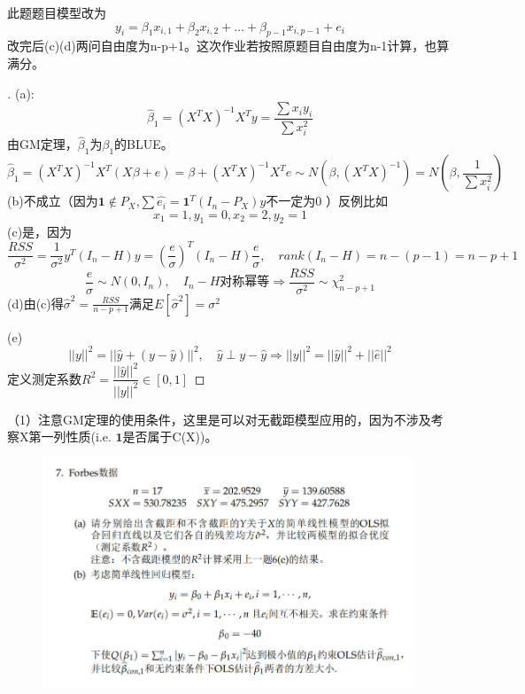 \documentclass[cn,hazy,green,12pt,normal]{elegantnote}
\numberwithin{equation}{section}
\numberwithin{subsection}{section}
\begin{document}
    此题题目模型改为\[y_i=\beta_1 x_{i,1}+\beta_2 x_{i,2}+\dots +\beta_{p-1}x_{i,p-1}+e_i\]
    改完后(c)(d)两问自由度为n-p+1。这次作业若按照原题目自由度为n-1计算，也算满分。
    
\begin{proof}[\solutionname]
(a):\[\hat{\beta}_1=(X^TX)^{-1}X^Ty = \dfrac{\sum x_iy_i}{\sum x_i^2}\]
由GM定理，$\hat{\beta}_1$为$\beta_1$的BLUE。
\[\hat{\beta}_1=(X^TX)^{-1}X^T(X\beta+e)=\beta+(X^TX)^{-1}X^T e\sim N(\beta,(X^TX)^{-1})= N(\beta,\dfrac{1}{\sum x_i^2})\]
\noindent (b)不成立（因为$\bm 1 \notin P_X$,$\sum \hat{e_i}=\bm 1^T(I_n-P_X)y$不一定为0 ）反例比如\[x_1=1,y_1 =0,x_2=2,y_2=1\]
\noindent (c)是，因为
\[\frac{RSS}{\sigma^2} =\frac{1}{\sigma^2}y^T(I_n-H)y=(\frac{e}{\sigma})^T(I_n-H)\frac{e}{\sigma}, \quad rank(I_n-H) = n-(p-1)=n-p+1\]
\[\frac{e}{\sigma}\sim N(0,I_n),\quad I_n-H\text{对称幂等}\Rightarrow \frac{RSS}{\sigma^2}\sim \chi_{n-p+1}^2\]
\noindent (d)由(c)得$\hat{\sigma}^2 = \frac{RSS}{n-p+1}$满足$E[\hat{\sigma}^2]=\sigma^2$

\noindent (e)\[||y||^2=||\hat{y}+(y-\hat{y})||^2,\quad \hat{y}\perp y-\hat{y} \Rightarrow ||y||^2=||\hat{y}||^2+||\hat{e}||^2\]
定义测定系数$R^2 = \dfrac{||\hat{y}||^2}{||y||^2}\in [0,1]$
\end{proof}

\begin{note}
    （1）注意GM定理的使用条件，这里是可以对无截距模型应用的，因为不涉及考察X第一列性质(i.e. $\bm 1$是否属于C(X))。
\end{note}
\newpage
\begin{homework}
\end{homework}
    \begin{figure}[!htbp]
        \centering
        \includegraphics[width=30em]{image/ex2_plt7.png}
    \end{figure}
\end{document}
